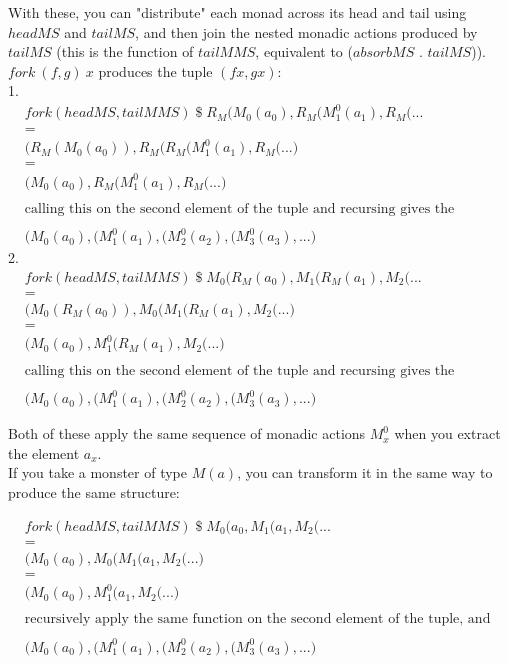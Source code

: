 \documentclass{article}
\begin{document}
With these, you can "distribute" each monad across its head and tail using $headMS$ and $tailMS$, and then join the nested monadic actions produced by $tailMS$ (this is the function of $tailMMS$, equivalent to ($absorbMS$ . $tailMS$)). $fork\:(f,g)\:x$ produces the tuple $(f x, g x)$:\\
\vspace{1cm}
1.
\begin{align*}
	&fork (headMS,tailMMS) \;\$\; R_M ( M_0 (a_0), R_M ( M^0_1 (a_1), R_M ( ...\\
	&=\\
	&\bigg( R_M ( M_0 (a_0) ), R_M ( R_M ( M^0_1 (a_1), R_M ( ... \bigg)\\
	&=\\
	&\bigg( M_0 (a_0), R_M ( M^0_1 (a_1), R_M ( ... \bigg) \\\\
	&\text{calling this on the second element of the tuple and recursing gives the infinitely nested tuple:}\\\\
	&\bigg( M_0 (a_0), \bigg( M^0_1 (a_1), \bigg( M^0_2 (a_2) , \bigg( M^0_3 (a_3), ... \bigg)
\end{align*}
2. 
\begin{align*}
	&fork (headMS,tailMMS) \;\$\; M_0 ( R_M (a_0), M_1 ( R_M (a_1), M_2 ( ...\\
	&=\\
	&\bigg( M_0 ( R_M (a_0) ), M_0 ( M_1 ( R_M (a_1), M_2 ( ... \bigg)\\
	&=\\
	&\bigg( M_0 (a_0), M^0_1 ( R_M (a_1), M_2 ( ... \bigg) \\\\
	&\text{calling this on the second element of the tuple and recursing gives the infinitely nested tuple:}\\\\
	&\bigg( M_0 (a_0), \bigg( M^0_1 (a_1), \bigg( M^0_2 (a_2) , \bigg( M^0_3 (a_3), ... \bigg)
\end{align*}

Both of these apply the same sequence of monadic actions $M^0_x$ when you extract the element $a_x$.\\

If you take a monster of type $M (a)$, you can transform it in the same way to produce the same structure:

\begin{align*}
	&fork (headMS,tailMMS) \;\$\; M_0 ( a_0, M_1 ( a_1, M_2 ( ...\\
	&=\\
	&\bigg( M_0 (a_0), M_0 ( M_1 ( a_1, M_2 ( ... \bigg)\\
	&=\\
	&\bigg( M_0 (a_0), M^0_1 ( a_1, M_2 ( ... \bigg) \\\\
	&\text{recursively apply the same function on the second element of the tuple, and continue this:}\\\\
	&\bigg( M_0 (a_0), \bigg( M^0_1 (a_1), \bigg( M^0_2 (a_2) , \bigg( M^0_3 (a_3), ... \bigg)
\end{align*}
\end{document}
